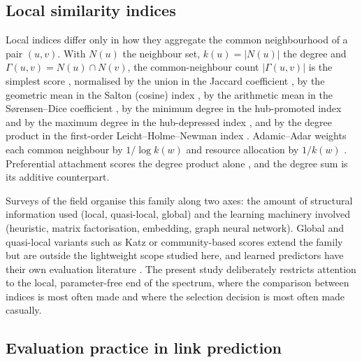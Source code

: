 \documentclass{comjnl}
\begin{document}
\subsection{Local similarity indices}

Local indices differ only in how they aggregate the common neighbourhood of a pair $(u,v)$. With $N(u)$ the neighbour set, $k(u)=|N(u)|$ the degree and $\Gamma(u,v)=N(u)\cap N(v)$, the common-neighbour count $|\Gamma(u,v)|$ is the simplest score \citep{libennowell2007link}, normalised by the union in the Jaccard coefficient \citep{jaccard1912distribution}, by the geometric mean in the Salton (cosine) index \citep{salton1983introduction}, by the arithmetic mean in the S{\o}rensen--Dice coefficient \citep{sorensen1948method}, by the minimum degree in the hub-promoted index and by the maximum degree in the hub-depressed index \citep{ravasz2002hierarchical}, and by the degree product in the first-order Leicht--Holme--Newman index \citep{leicht2006vertex}. Adamic--Adar weights each common neighbour by $1/\log k(w)$ \citep{adamic2003friends} and resource allocation by $1/k(w)$ \citep{zhou2009predicting}. Preferential attachment scores the degree product alone \citep{barabasi1999emergence}, and the degree sum is its additive counterpart.

Surveys of the field \citep{lu2011link,wang2015link,martinez2016survey,kumar2020link} organise this family along two axes: the amount of structural information used (local, quasi-local, global) and the learning machinery involved (heuristic, matrix factorisation, embedding, graph neural network). Global and quasi-local variants such as Katz \citep{katz1953new} or community-based scores extend the family but are outside the lightweight scope studied here, and learned predictors have their own evaluation literature \citep{ghasemian2020stacking,hu2020open}. The present study deliberately restricts attention to the local, parameter-free end of the spectrum, where the comparison between indices is most often made and where the selection decision is most often made casually.

\subsection{Evaluation practice in link prediction}
\end{document}

